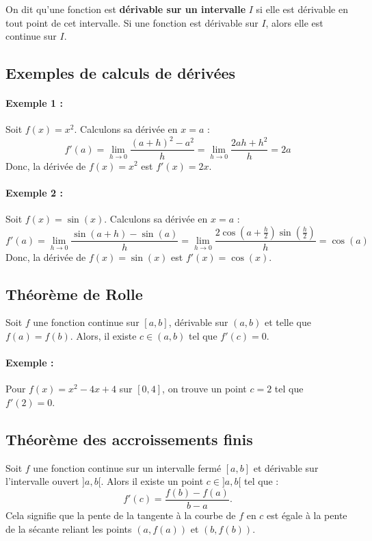 \documentclass{article}
\begin{document}
	On dit qu'une fonction est \textbf{dérivable sur un intervalle} \( I \) si elle est dérivable en tout point de cet intervalle. Si une fonction est dérivable sur \( I \), alors elle est continue sur \( I \).
	
	
	
	\subsection{Exemples de calculs de dérivées}
	
	\paragraph{Exemple 1 :} Soit \( f(x) = x^2 \). Calculons sa dérivée en \( x = a \) :
	\[
	f'(a) = \lim_{h \to 0} \frac{(a+h)^2 - a^2}{h} = \lim_{h \to 0} \frac{2ah + h^2}{h} = 2a
	\]
	Donc, la dérivée de \( f(x) = x^2 \) est \( f'(x) = 2x \).
	
	\paragraph{Exemple 2 :} Soit \( f(x) = \sin(x) \). Calculons sa dérivée en \( x = a \) :
	\[
	f'(a) = \lim_{h \to 0} \frac{\sin(a+h) - \sin(a)}{h} = \lim_{h \to 0} \frac{2 \cos\left( a + \frac{h}{2} \right) \sin\left( \frac{h}{2} \right)}{h} = \cos(a)
	\]
	Donc, la dérivée de \( f(x) = \sin(x) \) est \( f'(x) = \cos(x) \).
	
	
	\subsection{Théorème de Rolle}
	
	Soit \( f \) une fonction continue sur \([a, b]\), dérivable sur \((a, b)\) et telle que \( f(a) = f(b) \). Alors, il existe \( c \in (a, b) \) tel que \( f'(c) = 0 \).
	
	\paragraph{Exemple :} Pour \( f(x) = x^2 - 4x + 4 \) sur \([0, 4]\), on trouve un point \( c = 2 \) tel que \( f'(2) = 0 \).
	\subsection{Théorème des accroissements finis}
	
	Soit \( f \) une fonction continue sur un intervalle fermé \( [a, b] \) et dérivable sur l'intervalle ouvert \( ]a, b[ \). Alors il existe un point \( c \in ]a, b[ \) tel que :
	\[
	f'(c) = \frac{f(b) - f(a)}{b - a}.
	\]
	Cela signifie que la pente de la tangente à la courbe de \( f \) en \( c \) est égale à la pente de la sécante reliant les points \( (a, f(a)) \) et \( (b, f(b)) \).
	
\end{document}
